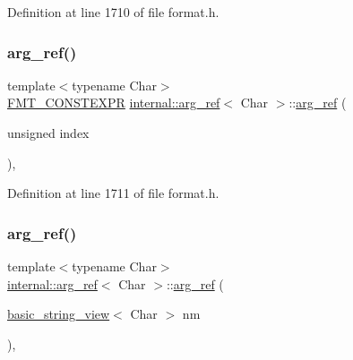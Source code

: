 Definition at line 1710 of file format.\+h.

\mbox{\label{structinternal_1_1arg__ref_a4cb4d50bfbaa4e9658a192d5c561bac0}} 
\subsubsection{\texorpdfstring{arg\+\_\+ref()}{arg\_ref()}\hspace{0.1cm}{\footnotesize\ttfamily [2/3]}}
{\footnotesize\ttfamily template$<$typename Char$>$ \\
\hyperlink{core_8h_a69201cb276383873487bf68b4ef8b4cd}{F\+M\+T\+\_\+\+C\+O\+N\+S\+T\+E\+X\+PR} \hyperlink{structinternal_1_1arg__ref}{internal\+::arg\+\_\+ref}$<$ Char $>$\+::\hyperlink{structinternal_1_1arg__ref}{arg\+\_\+ref} (\begin{DoxyParamCaption}\item[{unsigned}]{index }\end{DoxyParamCaption})\hspace{0.3cm}{\ttfamily [inline]}, {\ttfamily [explicit]}}



Definition at line 1711 of file format.\+h.

\mbox{\label{structinternal_1_1arg__ref_a4d9775a065fe0790d2f10f798bb6bd12}} 
\subsubsection{\texorpdfstring{arg\+\_\+ref()}{arg\_ref()}\hspace{0.1cm}{\footnotesize\ttfamily [3/3]}}
{\footnotesize\ttfamily template$<$typename Char$>$ \\
\hyperlink{structinternal_1_1arg__ref}{internal\+::arg\+\_\+ref}$<$ Char $>$\+::\hyperlink{structinternal_1_1arg__ref}{arg\+\_\+ref} (\begin{DoxyParamCaption}\item[{\hyperlink{classbasic__string__view}{basic\+\_\+string\+\_\+view}$<$ Char $>$}]{nm }\end{DoxyParamCaption})\hspace{0.3cm}{\ttfamily [inline]}, {\ttfamily [explicit]}}



